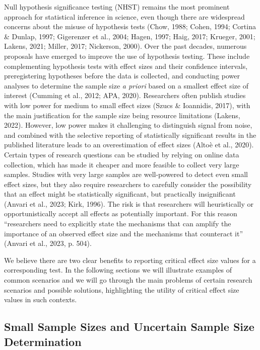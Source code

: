 \documentclass[
  man,floatsintext]{apa7}
\begin{document}
Null hypothesis significance testing (NHST) remains the most prominent approach for statistical inference in science, even though there are widespread concerns about the misuse of hypothesis tests (Chow, 1988; Cohen, 1994; Cortina \& Dunlap, 1997; Gigerenzer et al., 2004; Hagen, 1997; Haig, 2017; Krueger, 2001; Lakens, 2021; Miller, 2017; Nickerson, 2000). Over the past decades, numerous proposals have emerged to improve the use of hypothesis testing. These include complementing hypothesis tests with effect sizes and their confidence intervals, preregistering hypotheses before the data is collected, and conducting power analyses to determine the sample size \textit{a priori} based on a smallest effect size of interest (Cumming et al., 2012; APA, 2020). Researchers often publish studies with low power for medium to small effect sizes (Szucs \& Ioannidis, 2017), with the main justification for the sample size being resource limitations (Lakens, 2022). However, low power makes it challenging to distinguish signal from noise, and combined with the selective reporting of statistically significant results in the published literature leads to an overestimation of effect sizes (Altoè et al., 2020). Certain types of research questions can be studied by relying on online data collection, which has made it cheaper and more feasible to collect very large samples. Studies with very large samples are well-powered to detect even small effect sizes, but they also require researchers to carefully consider the possibility that an effect might be statistically significant, but practically insignificant (Anvari et al., 2023; Kirk, 1996). The risk is that researchers will heuristically or opportunistically accept all effects as potentially important. For this reason ``researchers need to explicitly state the mechanisms that can amplify the importance of an observed effect size and the mechanisms that counteract it'' (Anvari et al., 2023, p. 504).

We believe there are two clear benefits to reporting critical effect size values for a corresponding test. In the following sections we will illustrate examples of common scenarios and we will go through the main problems of certain research scenarios and possible solutions, highlighting the utility of critical effect size values in such contexts.

\subsection{Small Sample Sizes and Uncertain Sample Size Determination}\label{small-sample-sizes-and-uncertain-sample-size-determination}
\end{document}

